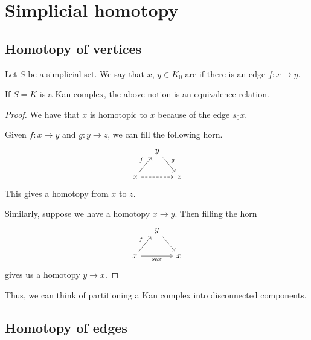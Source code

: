 \documentclass[main.tex]{subfiles}
\begin{document}
\chapter{Simplicial homotopy}
\label{ch:simplicial_homotopy}

\section{Homotopy of vertices}
\label{sec:homotopy_of_vertices}

\begin{definition}
  \label{def:homotopy_of_vertices}
  Let $S$ be a simplicial set. We say that $x$, $y \in K_{0}$ are  if there is an edge $f\colon x \to y$.
\end{definition}

\begin{theorem}
  \label{thm:homotopy_of_vertices_is_equivalence_relation}
  If $S = K$ is a Kan complex, the above notion is an equivalence relation.
\end{theorem}
\begin{proof}
  We have that $x$ is homotopic to $x$ because of the edge $s_{0}x$.

  Given $f\colon x \to y$ and $g\colon y \to z$, we can fill the following horn.
  \begin{equation*}
    \begin{tikzcd}[column sep=small]
      & y
      \arrow[dr, "g"]
      \\
      x
      \arrow[ur, "f"]
      \arrow[rr, dashed]
      && z
    \end{tikzcd}
  \end{equation*}
  This gives a homotopy from $x$ to $z$.

  Similarly, suppose we have a homotopy $x \to y$. Then filling the horn
  \begin{equation*}
    \begin{tikzcd}[column sep=small]
      & y
      \arrow[dr, dashed]
      \\
      x
      \arrow[ur, "f"]
      \arrow[rr, swap, "s_{0}x"]
      && x
    \end{tikzcd}
  \end{equation*}
  gives us a homotopy $y \to x$.
\end{proof}

Thus, we can think of partitioning a Kan complex into disconnected components.

\section{Homotopy of edges}
\label{sec:homotopy_of_edges}
\end{document}
